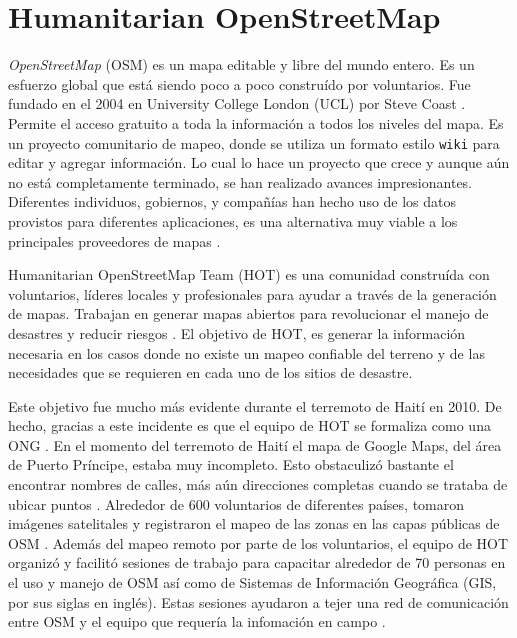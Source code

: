 \documentclass[12pt,spanish,oneside,breaklinks]{book}
\begin{document}
\section{Humanitarian OpenStreetMap}
\label{sec:org9a167f8}

\emph{OpenStreetMap} (OSM) es un mapa editable y libre del mundo entero. Es un esfuerzo global que está siendo poco a poco construído por voluntarios. Fue fundado en el 2004 en University College London (UCL) por Steve Coast \cite{chilton}. Permite el acceso gratuito a toda la información a todos los niveles del mapa. Es un proyecto comunitario de mapeo, donde se utiliza un formato estilo \texttt{wiki} para editar y agregar información. Lo cual lo hace un proyecto que crece y aunque aún no está completamente terminado, se han realizado avances impresionantes. Diferentes individuos, gobiernos, y compañías han hecho uso de los datos provistos para diferentes aplicaciones, es una alternativa muy viable a los principales proveedores de mapas \cite{osmwiki}.

Humanitarian OpenStreetMap Team (HOT) es una comunidad construída con voluntarios, líderes locales y profesionales para ayudar a través de la generación de mapas. Trabajan en generar mapas abiertos para revolucionar el manejo de desastres y reducir riesgos \cite{hotosmorg}.  El objetivo de HOT, es generar la información necesaria en los casos donde no existe un mapeo confiable del terreno y de las necesidades que se requieren en cada uno de los sitios de desastre.

Este objetivo fue mucho más evidente durante el terremoto de Haití en 2010. De hecho, gracias a este incidente es que el equipo de HOT se formaliza como una ONG \cite{sorden2014}. En el momento del terremoto de Haití el mapa de Google Maps, del área de Puerto Príncipe, estaba muy incompleto. Esto obstaculizó bastante el encontrar nombres de calles, más aún direcciones completas cuando se trataba de ubicar puntos \cite{meier2012}. Alrededor de 600 voluntarios de diferentes países, tomaron imágenes satelitales y registraron el mapeo de las zonas en las capas públicas de OSM \cite{meier2012}. Además del mapeo remoto por parte de los voluntarios, el equipo de HOT organizó y facilitó sesiones de trabajo para capacitar alrededor de 70 personas en el uso y manejo de OSM así como de Sistemas de Información Geográfica (GIS, por sus siglas en inglés). Estas sesiones ayudaron a tejer una red de comunicación entre OSM y el equipo que requería la infomación en campo \cite{sorden2014}.
\end{document}
